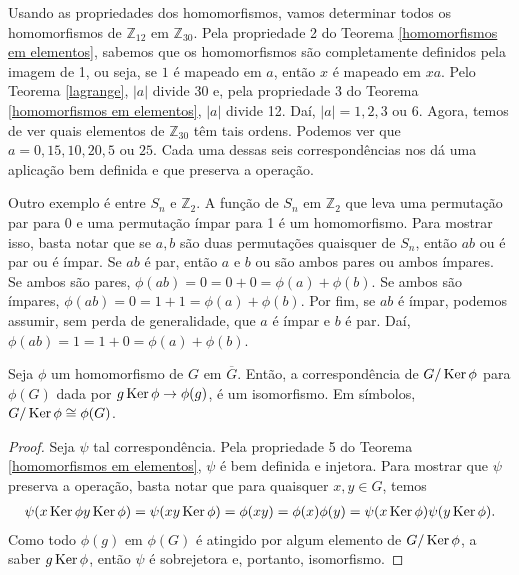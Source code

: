 	\begin{example}
	Usando as propriedades dos homomorfismos, vamos determinar todos os homomorfismos 
	de $\mathbb{Z}_{12}$ em $\mathbb{Z}_{30}$. Pela propriedade 2 do 
	Teorema \ref{homomorfismos em elementos},
	sabemos que os homomorfismos são completamente definidos pela imagem de 1, ou seja, 
	se $1$ é mapeado em $a$, então $x$ é mapeado em $xa$. Pelo Teorema \ref{lagrange}, $|a|$ divide 30 e,
	pela propriedade 3 do Teorema \ref{homomorfismos em elementos}, $|a|$ divide 12. Daí, 
	$|a| = 1, 2, 3 \text{ ou } 6$. Agora, temos de ver quais elementos de $\mathbb{Z}_{30}$ têm tais ordens.
	Podemos ver que $a = 0, 15, 10, 20, 5 \text{ ou } 25$. Cada uma dessas seis correspondências nos dá uma
	aplicação bem definida e que preserva a operação.
	\end{example}
	\begin{example}
	Outro exemplo é entre $S_n$ e $\mathbb{Z}_2$. A função de $S_n$ em $\mathbb{Z}_2$ 
	que leva uma permutação par para 0 e uma permutação ímpar para 1 é um homomorfismo. Para mostrar isso, 
	basta notar que se $a,b$ são duas permutações quaisquer de $S_n$, então $ab$ ou é par ou é ímpar. 
	Se $ab$ é par, então $a$ e $b$ ou são ambos pares ou ambos ímpares. Se ambos são pares, 
	$\phi(ab) = 0 = 0 + 0 = \phi(a) + \phi(b)$. Se ambos são ímpares, 
	$\phi(ab) = 0 = 1 + 1 = \phi(a) + \phi(b)$. Por fim, se $ab$ é ímpar, podemos assumir, 
	sem perda de generalidade, que $a$ é ímpar e $b$ é par. Daí, $\phi(ab) = 1 = 1 + 0 = \phi(a) + \phi(b)$.
	\end{example}
	\begin{theorem}
	\label{primeiro teorema de isomorfismo}
		Seja $\phi$ um homomorfismo de $G$ em $\overline{G}$. Então, a correspondência de $G/\operatorname{Ker}\phi$ 
		para $\phi(G)$ dada por $g\operatorname{Ker}\phi \to \phi(g)$, é um isomorfismo. 
		Em símbolos, $G/\operatorname{Ker}\phi\cong\phi(G)$.
	\end{theorem}
	\begin{proof}
		Seja $\psi$ tal correspondência. Pela propriedade 5 do Teorema \ref{homomorfismos em elementos}, 
		$\psi$ é bem definida e injetora. Para mostrar que $\psi$ preserva a operação, basta notar que 
		para quaisquer $x,y\in G$, temos
		\begin{align*}
		    \psi(x\operatorname{Ker}\phi y\operatorname{Ker}\phi) 
		    = \psi(xy\operatorname{Ker}\phi) 
		    = \phi(xy) 
		    = \phi(x)\phi(y) 
		    = \psi(x\operatorname{Ker}\phi)\psi(y\operatorname{Ker}\phi).
		\end{align*}
		Como todo $\phi(g)$ em $\phi(G)$ é atingido por algum elemento de $G/\operatorname{Ker}\phi$, 
		a saber $g\operatorname{Ker}\phi$, então $\psi$ é sobrejetora e, portanto, isomorfismo.
	\end{proof}
